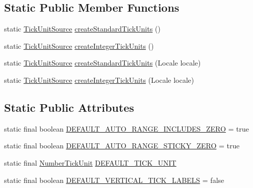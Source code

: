 \subsection*{Static Public Member Functions}
\begin{DoxyCompactItemize}
\item 
static \mbox{\hyperlink{interfaceorg_1_1jfree_1_1chart_1_1axis_1_1_tick_unit_source}{Tick\+Unit\+Source}} \mbox{\hyperlink{classorg_1_1jfree_1_1chart_1_1axis_1_1_number_axis_ac9f43609e3f99cac998a2ece777809c6}{create\+Standard\+Tick\+Units}} ()
\item 
static \mbox{\hyperlink{interfaceorg_1_1jfree_1_1chart_1_1axis_1_1_tick_unit_source}{Tick\+Unit\+Source}} \mbox{\hyperlink{classorg_1_1jfree_1_1chart_1_1axis_1_1_number_axis_adc561730bb342bdaf2c59d8bd5897718}{create\+Integer\+Tick\+Units}} ()
\item 
static \mbox{\hyperlink{interfaceorg_1_1jfree_1_1chart_1_1axis_1_1_tick_unit_source}{Tick\+Unit\+Source}} \mbox{\hyperlink{classorg_1_1jfree_1_1chart_1_1axis_1_1_number_axis_aa8fced0acbcb92ac7cc67b394ee9736f}{create\+Standard\+Tick\+Units}} (Locale locale)
\item 
static \mbox{\hyperlink{interfaceorg_1_1jfree_1_1chart_1_1axis_1_1_tick_unit_source}{Tick\+Unit\+Source}} \mbox{\hyperlink{classorg_1_1jfree_1_1chart_1_1axis_1_1_number_axis_ab324d311c92e63cdead809641c8a39d2}{create\+Integer\+Tick\+Units}} (Locale locale)
\end{DoxyCompactItemize}
\subsection*{Static Public Attributes}
\begin{DoxyCompactItemize}
\item 
static final boolean \mbox{\hyperlink{classorg_1_1jfree_1_1chart_1_1axis_1_1_number_axis_a37d5a069e666216448bf854c3f913b2d}{D\+E\+F\+A\+U\+L\+T\+\_\+\+A\+U\+T\+O\+\_\+\+R\+A\+N\+G\+E\+\_\+\+I\+N\+C\+L\+U\+D\+E\+S\+\_\+\+Z\+E\+RO}} = true
\item 
static final boolean \mbox{\hyperlink{classorg_1_1jfree_1_1chart_1_1axis_1_1_number_axis_a137dc7fc119933e64c2d7f2512a0699c}{D\+E\+F\+A\+U\+L\+T\+\_\+\+A\+U\+T\+O\+\_\+\+R\+A\+N\+G\+E\+\_\+\+S\+T\+I\+C\+K\+Y\+\_\+\+Z\+E\+RO}} = true
\item 
static final \mbox{\hyperlink{classorg_1_1jfree_1_1chart_1_1axis_1_1_number_tick_unit}{Number\+Tick\+Unit}} \mbox{\hyperlink{classorg_1_1jfree_1_1chart_1_1axis_1_1_number_axis_a5355331bbd9539e8ff4fa2d3b1f2efb4}{D\+E\+F\+A\+U\+L\+T\+\_\+\+T\+I\+C\+K\+\_\+\+U\+N\+IT}}
\item 
static final boolean \mbox{\hyperlink{classorg_1_1jfree_1_1chart_1_1axis_1_1_number_axis_a2e6a2ec5289a6c29fead3d8cc90bd427}{D\+E\+F\+A\+U\+L\+T\+\_\+\+V\+E\+R\+T\+I\+C\+A\+L\+\_\+\+T\+I\+C\+K\+\_\+\+L\+A\+B\+E\+LS}} = false
\end{DoxyCompactItemize}
